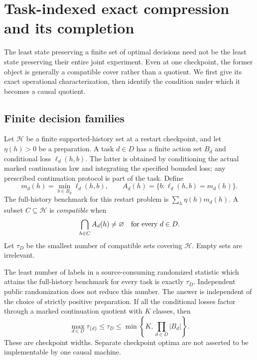 \section{Task-indexed exact compression and its completion}
\label{sec:v11-tasks}

The least state preserving a finite set of optimal decisions need not be
the least state preserving their entire joint experiment. Even at one
checkpoint, the former object is generally a compatible cover rather than
a quotient. We first give its exact operational characterization, then
identify the condition under which it becomes a causal quotient.

\subsection{Finite decision families}
Let $\mathcal H$ be a finite supported-history set at a restart checkpoint,
and let $\eta(h)>0$ be a preparation. A task $d\in D$ has a finite action
set $B_d$ and conditional loss $\ell_d(h,b)$. The latter is obtained by
conditioning the actual marked continuation law and integrating the
specified bounded loss; any prescribed continuation protocol is part of
the task. Define
\[
 m_d(h)=\min_{b\in B_d}\ell_d(h,b),\qquad
 A_d(h)=\{b:\ell_d(h,b)=m_d(h)\}.
\]
The full-history benchmark for this restart problem is
$\sum_h\eta(h)m_d(h)$. A subset $C\subseteq\mathcal H$ is \emph{compatible}
when
\begin{equation}
 \bigcap_{h\in C}A_d(h)\ne\varnothing\quad\hbox{for every }d\in D.
 \label{eq:v11-compatible}
\end{equation}
Let $\tau_D$ be the smallest number of compatible sets covering
$\mathcal H$. Empty sets are irrelevant.

\begin{theorem}
\label{thm:v11-taskcover}
The least number of labels in a source-consuming randomized statistic
which attains the full-history benchmark for every task is exactly
$\tau_D$. Independent public randomization does not reduce this number.
The answer is independent of the choice of strictly positive preparation.
If all the conditional losses factor through a marked continuation
quotient with $K$ classes, then
\[
 \max_{d\in D}\tau_{\{d\}}\le\tau_D
       \le\min\left\{K,\prod_{d\in D}|B_d|\right\}.
\]
These are checkpoint widths. Separate checkpoint optima are not asserted
to be implementable by one causal machine.
\end{theorem}

